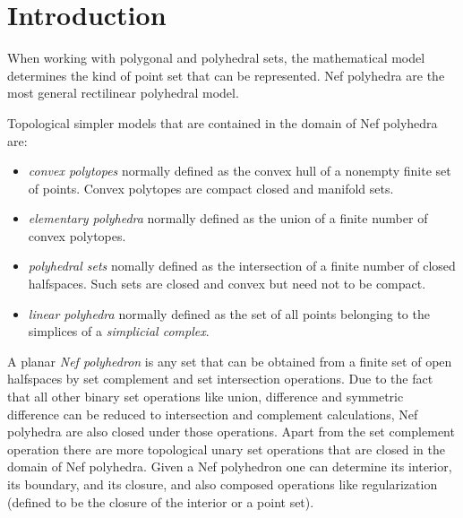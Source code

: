 \section{Introduction}

When working with polygonal and polyhedral sets, the mathematical
model determines the kind of point set that can be represented. Nef
polyhedra are the most general rectilinear polyhedral model.

Topological simpler models that are contained in the domain of
Nef polyhedra are:
\begin{itemize}
\item \emph{convex polytopes} normally defined as the convex hull
  of a nonempty finite set of points. Convex polytopes are 
  compact closed and manifold sets. 
\item \emph{elementary polyhedra} normally defined as the union
  of a finite number of convex polytopes. 
\item \emph{polyhedral sets} nomally defined as the intersection
  of a finite number of closed halfspaces. Such sets are closed and
  convex but need not to be compact. 
\item \emph{linear polyhedra} normally defined as the set of all
points belonging to the simplices of a \emph{simplicial complex}. 
\end{itemize}

A planar \emph{Nef polyhedron} is any set that can be obtained from a
finite set of open halfspaces by set complement and set intersection
operations. Due to the fact that all other binary set operations like
union, difference and symmetric difference can be reduced to
intersection and complement calculations, Nef polyhedra are also closed
under those operations. Apart from the set complement operation there
are more topological unary set operations that are closed in the
domain of Nef polyhedra. Given a Nef polyhedron one can determine its
interior, its boundary, and its closure, and also composed operations
like regularization (defined to be the closure of the interior or a
point set).

